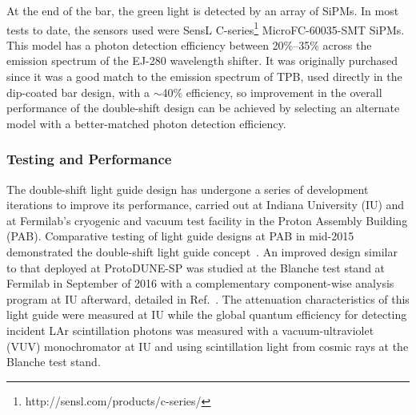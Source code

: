 


At the end of the bar, the green light is detected by an array of SiPMs. In most tests to date, the sensors used were SensL C-series\footnote{http://sensl.com/products/c-series/} MicroFC-60035-SMT SiPMs. This model has a photon detection efficiency between 20\%--35\% across the emission spectrum of the EJ-280 wavelength shifter. It was originally purchased since it was a good match to the emission spectrum of TPB, used directly in the dip-coated bar design, with a $\sim$40\% efficiency, so improvement in the overall performance of the double-shift design can be achieved by selecting an alternate model with a better-matched photon detection efficiency.

\subsubsection{Testing and Performance}

The double-shift light guide design has undergone a series of development iterations to improve its performance, carried out at Indiana University (IU) and at Fermilab's cryogenic and vacuum test facility in the Proton Assembly Building (PAB). Comparative testing of light guide designs at PAB in mid-2015 demonstrated the double-shift light guide concept~\cite{bib:JINST-11-C05019}. 
An improved design similar to that deployed at ProtoDUNE-SP was studied at the Blanche test stand at Fermilab in September of 2016 with a complementary component-wise analysis program at IU afterward, detailed in Ref.~\cite{bib:DoubleShiftLG-NIM-171113}. The attenuation characteristics of this light guide were measured at IU while the global quantum efficiency for detecting incident LAr scintillation photons was measured with a vacuum-ultraviolet (VUV) monochromator at IU and using scintillation light from cosmic rays at the Blanche test stand.

